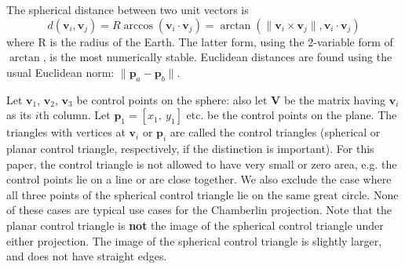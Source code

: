 \documentclass[]{interact}
\begin{document}
The spherical distance between two unit vectors is
$$
d\left(\mathbf v_i, \mathbf v_j\right) = R \arccos\left(\mathbf v_i \cdot \mathbf v_j\right)
=\arctan\left(\|\mathbf v_i \times \mathbf v_j\|, \mathbf v_i \cdot \mathbf v_j\right)
$$
where R is the radius of the Earth. The latter form, using the 2-variable form
of $\arctan$, is the most numerically stable. Euclidean distances are found
using the usual Euclidean norm: $\|\mathbf p_a - \mathbf p_b\|$.

Let $\mathbf v_1$, $\mathbf v_2$, $\mathbf v_3$ be control points on the sphere:
also let $\mathbf V$ be the matrix having $\mathbf v_i$ as its $i$th column. Let
$\mathbf p_1 = [x_1,~y_1]$ etc. be the control points on the plane. The
triangles with vertices at $\mathbf v_i$ or $\mathbf p_i$ are called the
control triangles (spherical or planar control triangle, respectively, if the
distinction is important). For this paper, the control triangle is not allowed
to have very small or zero area, e.g. the control points lie on a line or are
close together. We also exclude the case where all three points of the spherical
control triangle lie on the same great circle. None of these cases are typical
use cases for the Chamberlin projection. Note that the planar control triangle
is \textbf{not} the image of the spherical control triangle under either
projection. The image of the
spherical control triangle is slightly larger, and does not have straight edges.
\end{document}
